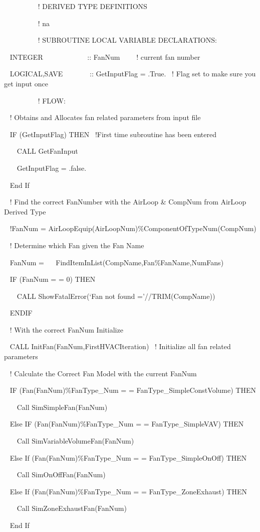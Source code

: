 ~~~~~~~~~ ! DERIVED TYPE DEFINITIONS

~~~~~~~~~ ! na

~~~~~~~~~ ! SUBROUTINE LOCAL VARIABLE DECLARATIONS:

~ INTEGER~~~~~~~~~~~~ :: FanNum~~~~ ! current fan number

~ LOGICAL,SAVE~~~~~~~ :: GetInputFlag = .True.~ ! Flag set to make sure you get input once

~~~~~~~~~ ! FLOW:

~ ! Obtains and Allocates fan related parameters from input file

~ IF (GetInputFlag) THEN~ !First time subroutine has been entered

~~~ CALL GetFanInput

~~~ GetInputFlag = .false.

~ End If

~ ! Find the correct FanNumber with the AirLoop \& CompNum from AirLoop Derived Type

~ !FanNum = AirLoopEquip(AirLoopNum)\%ComponentOfTypeNum(CompNum)

~ ! Determine which Fan given the Fan Name

~ FanNum = ~~ FindItemInList(CompName,Fan\%FanName,NumFans)

~ IF (FanNum = = 0) THEN

~~~ CALL ShowFatalError(`Fan not found ='//TRIM(CompName))

~ ENDIF

~ ! With the correct FanNum Initialize

~ CALL InitFan(FanNum,FirstHVACIteration)~ ! Initialize all fan related parameters

~ ! Calculate the Correct Fan Model with the current FanNum

~ IF (Fan(FanNum)\%FanType\_Num = = FanType\_SimpleConstVolume) THEN

~~~ Call SimSimpleFan(FanNum)

~ Else IF (Fan(FanNum)\%FanType\_Num = = FanType\_SimpleVAV) THEN

~~~ Call SimVariableVolumeFan(FanNum)

~ Else If (Fan(FanNum)\%FanType\_Num = = FanType\_SimpleOnOff) THEN

~~~ Call SimOnOffFan(FanNum)

~ Else If (Fan(FanNum)\%FanType\_Num = = FanType\_ZoneExhaust) THEN

~~~ Call SimZoneExhaustFan(FanNum)

~ End If

